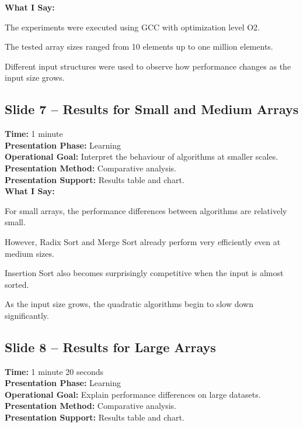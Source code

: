 \documentclass[12pt]{article}
\begin{document}
\textbf{What I Say:}

The experiments were executed using GCC with optimization level O2.

The tested array sizes ranged from 10 elements up to one million elements.

Different input structures were used to observe how performance changes as the input size grows.

\vspace{0.4cm}

\subsection*{Slide 7 -- Results for Small and Medium Arrays}

\textbf{Time:} 1 minute\\
\textbf{Presentation Phase:} Learning\\
\textbf{Operational Goal:} Interpret the behaviour of algorithms at smaller scales.\\
\textbf{Presentation Method:} Comparative analysis.\\
\textbf{Presentation Support:} Results table and chart.\\

\textbf{What I Say:}

For small arrays, the performance differences between algorithms are relatively small.

However, Radix Sort and Merge Sort already perform very efficiently even at medium sizes.

Insertion Sort also becomes surprisingly competitive when the input is almost sorted.

As the input size grows, the quadratic algorithms begin to slow down significantly.

\vspace{0.4cm}

\subsection*{Slide 8 -- Results for Large Arrays}

\textbf{Time:} 1 minute 20 seconds\\
\textbf{Presentation Phase:} Learning\\
\textbf{Operational Goal:} Explain performance differences on large datasets.\\
\textbf{Presentation Method:} Comparative analysis.\\
\textbf{Presentation Support:} Results table and chart.\\
\end{document}
